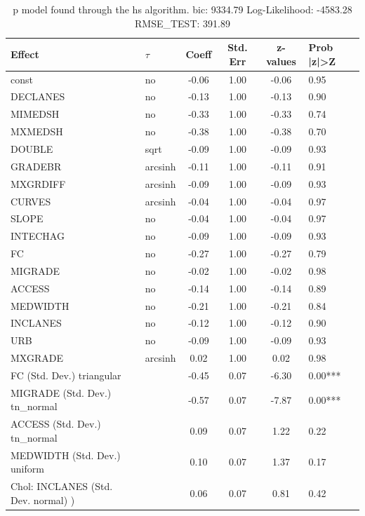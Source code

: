 \begin{table}
	\caption{p model found through the hs algorithm. bic: 9334.79 Log-Likelihood: -4583.28 RMSE_TEST: 391.89}
	\begin{center}
		\begin{tabular}{|l|l|c|c|c|l|}
			\hline
			Effect & $\tau$ & Coeff & Std. Err & z-values & Prob |z|>Z \\
			\hline
			const & no & -0.06 & 1.00 & -0.06 & 0.95 \\
			\hline
			DECLANES & no & -0.13 & 1.00 & -0.13 & 0.90 \\
			\hline
			MIMEDSH & no & -0.33 & 1.00 & -0.33 & 0.74 \\
			\hline
			MXMEDSH & no & -0.38 & 1.00 & -0.38 & 0.70 \\
			\hline
			DOUBLE & sqrt & -0.09 & 1.00 & -0.09 & 0.93 \\
			\hline
			GRADEBR & arcsinh & -0.11 & 1.00 & -0.11 & 0.91 \\
			\hline
			MXGRDIFF & arcsinh & -0.09 & 1.00 & -0.09 & 0.93 \\
			\hline
			CURVES & arcsinh & -0.04 & 1.00 & -0.04 & 0.97 \\
			\hline
			SLOPE & no & -0.04 & 1.00 & -0.04 & 0.97 \\
			\hline
			INTECHAG & no & -0.09 & 1.00 & -0.09 & 0.93 \\
			\hline
			FC & no & -0.27 & 1.00 & -0.27 & 0.79 \\
			\hline
			MIGRADE & no & -0.02 & 1.00 & -0.02 & 0.98 \\
			\hline
			ACCESS & no & -0.14 & 1.00 & -0.14 & 0.89 \\
			\hline
			MEDWIDTH & no & -0.21 & 1.00 & -0.21 & 0.84 \\
			\hline
			INCLANES & no & -0.12 & 1.00 & -0.12 & 0.90 \\
			\hline
			URB & no & -0.09 & 1.00 & -0.09 & 0.93 \\
			\hline
			MXGRADE & arcsinh & 0.02 & 1.00 & 0.02 & 0.98 \\
			\hline
			FC (Std. Dev.) triangular &  & -0.45 & 0.07 & -6.30 & 0.00*** \\
			\hline
			MIGRADE (Std. Dev.) tn_normal &  & -0.57 & 0.07 & -7.87 & 0.00*** \\
			\hline
			ACCESS (Std. Dev.) tn_normal &  & 0.09 & 0.07 & 1.22 & 0.22 \\
			\hline
			MEDWIDTH (Std. Dev.) uniform &  & 0.10 & 0.07 & 1.37 & 0.17 \\
			\hline
			 Chol: INCLANES (Std. Dev. normal) ) &  & 0.06 & 0.07 & 0.81 & 0.42 \\

\end{tabular}
\end{center}
\end{table}
